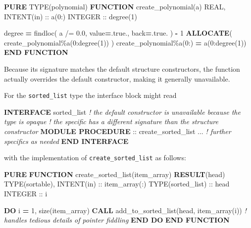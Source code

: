 \documentclass[]{scrartcl}
\newenvironment{Shaded}{}{}
\newcommand{\CommentTok}[1]{\textcolor[rgb]{0.38,0.63,0.69}{\textit{#1}}}
\newcommand{\ConstantTok}[1]{\textcolor[rgb]{0.53,0.00,0.00}{#1}}
\newcommand{\DataTypeTok}[1]{\textcolor[rgb]{0.56,0.13,0.00}{#1}}
\newcommand{\DecValTok}[1]{\textcolor[rgb]{0.25,0.63,0.44}{#1}}
\newcommand{\FloatTok}[1]{\textcolor[rgb]{0.25,0.63,0.44}{#1}}
\newcommand{\FunctionTok}[1]{\textcolor[rgb]{0.02,0.16,0.49}{#1}}
\newcommand{\KeywordTok}[1]{\textcolor[rgb]{0.00,0.44,0.13}{\textbf{#1}}}
\newcommand{\NormalTok}[1]{#1}
\newcommand{\OperatorTok}[1]{\textcolor[rgb]{0.40,0.40,0.40}{#1}}
\begin{document}
\begin{Shaded}
\begin{Highlighting}[]
\KeywordTok{PURE} \DataTypeTok{TYPE(polynomial)} \KeywordTok{FUNCTION}\NormalTok{ create\_polynomial(a)}
   \DataTypeTok{REAL}\NormalTok{, }\DataTypeTok{INTENT(in)} \DataTypeTok{::}\NormalTok{ a(}\DecValTok{0}\NormalTok{:)}
   \DataTypeTok{INTEGER} \DataTypeTok{::}\NormalTok{ degree(}\DecValTok{1}\NormalTok{)}

\NormalTok{   degree }\KeywordTok{=} \FunctionTok{findloc}\NormalTok{( a }\OperatorTok{/=} \FloatTok{0.0}\NormalTok{, }\DataTypeTok{value}\KeywordTok{=}\ConstantTok{.true.}\NormalTok{, back}\KeywordTok{=}\ConstantTok{.true.}\NormalTok{ ) }\KeywordTok{{-}} \DecValTok{1}
   \KeywordTok{ALLOCATE}\NormalTok{( create\_polynomial}\OperatorTok{\%}\NormalTok{a(}\DecValTok{0}\NormalTok{:degree(}\DecValTok{1}\NormalTok{)) )}
\NormalTok{   create\_polynomial}\OperatorTok{\%}\NormalTok{a(}\DecValTok{0}\NormalTok{:) }\KeywordTok{=}\NormalTok{ a(}\DecValTok{0}\NormalTok{:degree(}\DecValTok{1}\NormalTok{))}
\KeywordTok{END FUNCTION}
\end{Highlighting}
\end{Shaded}

Because its signature matches the default structure
constructor\textquotesingle s, the function actually overrides the
default constructor, making it generally unavailable.

For the \texttt{sorted\_list} type the interface block might read

\begin{Shaded}
\begin{Highlighting}[]
\KeywordTok{INTERFACE}\NormalTok{ sorted\_list}
\CommentTok{! the default constructor is unavailable because the type is opaque}
\CommentTok{! the specific has a different signature than the structure constructor}
   \KeywordTok{MODULE PROCEDURE} \DataTypeTok{::}\NormalTok{ create\_sorted\_list}
\NormalTok{   ... }\CommentTok{! further specifics as needed}
\KeywordTok{END INTERFACE}
\end{Highlighting}
\end{Shaded}

with the implementation of \texttt{create\_sorted\_list} as follows:

\begin{Shaded}
\begin{Highlighting}[]
\KeywordTok{PURE} \KeywordTok{FUNCTION}\NormalTok{ create\_sorted\_list(item\_array) }\KeywordTok{RESULT}\NormalTok{(head)}
   \DataTypeTok{TYPE(sortable)}\NormalTok{, }\DataTypeTok{INTENT(in)} \DataTypeTok{::}\NormalTok{ item\_array(:)}
   \DataTypeTok{TYPE(sorted\_list)} \DataTypeTok{::}\NormalTok{ head}
   \DataTypeTok{INTEGER} \DataTypeTok{::}\NormalTok{ i}

   \KeywordTok{DO}\NormalTok{ i }\KeywordTok{=} \DecValTok{1}\NormalTok{, }\FunctionTok{size}\NormalTok{(item\_array)}
      \KeywordTok{CALL}\NormalTok{ add\_to\_sorted\_list(head, item\_array(i))}
      \CommentTok{! handles tedious details of pointer fiddling}
   \KeywordTok{END DO}
\KeywordTok{END FUNCTION}
\end{Highlighting}
\end{Shaded}
\end{document}
